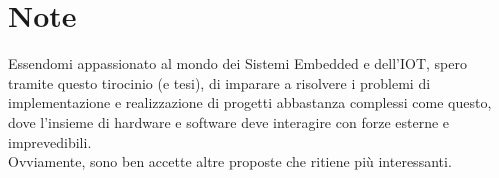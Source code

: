 \documentclass[]{article}
\begin{document}
\section{Note}
Essendomi appassionato al mondo dei Sistemi Embedded e dell'IOT, spero tramite questo tirocinio (e tesi), di imparare a risolvere i problemi di implementazione e realizzazione di progetti abbastanza complessi come questo, dove l'insieme di hardware e software deve interagire con forze esterne e imprevedibili.\\
Ovviamente, sono ben accette altre proposte che ritiene più interessanti.
\end{document}
